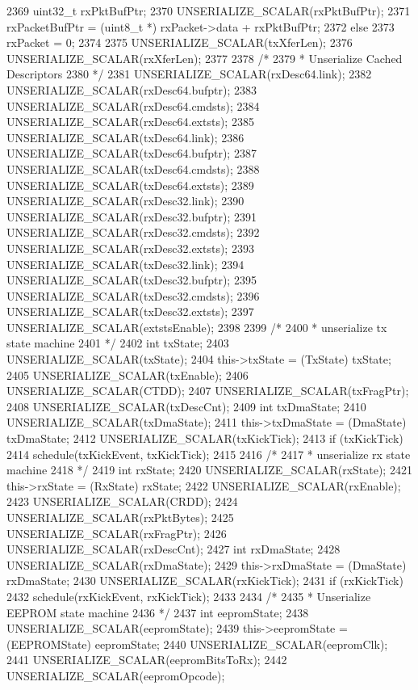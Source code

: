 \begin{DoxyCode}
{{2369         uint32_t rxPktBufPtr;
2370         UNSERIALIZE_SCALAR(rxPktBufPtr);
2371         rxPacketBufPtr = (uint8_t *) rxPacket->data + rxPktBufPtr;
2372     } else
2373         rxPacket = 0;
2374 
2375     UNSERIALIZE_SCALAR(txXferLen);
2376     UNSERIALIZE_SCALAR(rxXferLen);
2377 
2378     /*
2379      * Unserialize Cached Descriptors
2380      */
2381     UNSERIALIZE_SCALAR(rxDesc64.link);
2382     UNSERIALIZE_SCALAR(rxDesc64.bufptr);
2383     UNSERIALIZE_SCALAR(rxDesc64.cmdsts);
2384     UNSERIALIZE_SCALAR(rxDesc64.extsts);
2385     UNSERIALIZE_SCALAR(txDesc64.link);
2386     UNSERIALIZE_SCALAR(txDesc64.bufptr);
2387     UNSERIALIZE_SCALAR(txDesc64.cmdsts);
2388     UNSERIALIZE_SCALAR(txDesc64.extsts);
2389     UNSERIALIZE_SCALAR(rxDesc32.link);
2390     UNSERIALIZE_SCALAR(rxDesc32.bufptr);
2391     UNSERIALIZE_SCALAR(rxDesc32.cmdsts);
2392     UNSERIALIZE_SCALAR(rxDesc32.extsts);
2393     UNSERIALIZE_SCALAR(txDesc32.link);
2394     UNSERIALIZE_SCALAR(txDesc32.bufptr);
2395     UNSERIALIZE_SCALAR(txDesc32.cmdsts);
2396     UNSERIALIZE_SCALAR(txDesc32.extsts);
2397     UNSERIALIZE_SCALAR(extstsEnable);
2398 
2399     /*
2400      * unserialize tx state machine
2401      */
2402     int txState;
2403     UNSERIALIZE_SCALAR(txState);
2404     this->txState = (TxState) txState;
2405     UNSERIALIZE_SCALAR(txEnable);
2406     UNSERIALIZE_SCALAR(CTDD);
2407     UNSERIALIZE_SCALAR(txFragPtr);
2408     UNSERIALIZE_SCALAR(txDescCnt);
2409     int txDmaState;
2410     UNSERIALIZE_SCALAR(txDmaState);
2411     this->txDmaState = (DmaState) txDmaState;
2412     UNSERIALIZE_SCALAR(txKickTick);
2413     if (txKickTick)
2414         schedule(txKickEvent, txKickTick);
2415 
2416     /*
2417      * unserialize rx state machine
2418      */
2419     int rxState;
2420     UNSERIALIZE_SCALAR(rxState);
2421     this->rxState = (RxState) rxState;
2422     UNSERIALIZE_SCALAR(rxEnable);
2423     UNSERIALIZE_SCALAR(CRDD);
2424     UNSERIALIZE_SCALAR(rxPktBytes);
2425     UNSERIALIZE_SCALAR(rxFragPtr);
2426     UNSERIALIZE_SCALAR(rxDescCnt);
2427     int rxDmaState;
2428     UNSERIALIZE_SCALAR(rxDmaState);
2429     this->rxDmaState = (DmaState) rxDmaState;
2430     UNSERIALIZE_SCALAR(rxKickTick);
2431     if (rxKickTick)
2432         schedule(rxKickEvent, rxKickTick);
2433 
2434     /*
2435      * Unserialize EEPROM state machine
2436      */
2437     int eepromState;
2438     UNSERIALIZE_SCALAR(eepromState);
2439     this->eepromState = (EEPROMState) eepromState;
2440     UNSERIALIZE_SCALAR(eepromClk);
2441     UNSERIALIZE_SCALAR(eepromBitsToRx);
2442     UNSERIALIZE_SCALAR(eepromOpcode);
}
\end{DoxyCode}

